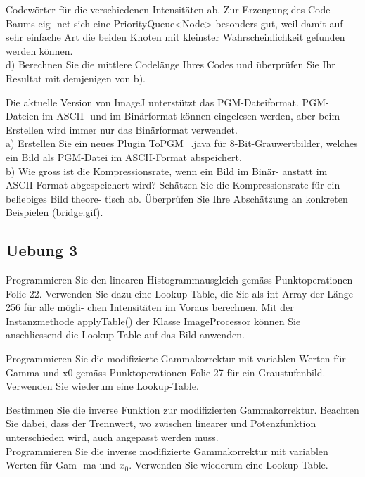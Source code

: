 \documentclass[10pt]{article}
\begin{document}
Codewörter für die verschiedenen Intensitäten ab. Zur Erzeugung des Code-Baums eig-
net sich eine PriorityQueue<Node> besonders gut, weil damit auf sehr einfache Art die
beiden Knoten mit kleinster Wahrscheinlichkeit gefunden werden können.\\
d) Berechnen Sie die mittlere Codelänge Ihres Codes und überprüfen Sie Ihr Resultat mit
demjenigen von b).


Die aktuelle Version von ImageJ unterstützt das PGM-Dateiformat. PGM-Dateien im ASCII-
und im Binärformat können eingelesen werden, aber beim Erstellen wird immer nur das
Binärformat verwendet.\\
a) Erstellen Sie ein neues Plugin ToPGM\_.java für 8-Bit-Grauwertbilder, welches ein Bild
als PGM-Datei im ASCII-Format abspeichert.\\
b) Wie gross ist die Kompressionsrate, wenn ein Bild im Binär- anstatt im ASCII-Format
abgespeichert wird? Schätzen Sie die Kompressionsrate für ein beliebiges Bild theore-
tisch ab. Überprüfen Sie Ihre Abschätzung an konkreten Beispielen (bridge.gif).

\subsection{Uebung 3}
Programmieren Sie den linearen Histogrammausgleich gemäss Punktoperationen Folie 22.
Verwenden Sie dazu eine Lookup-Table, die Sie als int-Array der Länge 256 für alle mögli-
chen Intensitäten im Voraus berechnen. Mit der Instanzmethode applyTable() der Klasse
ImageProcessor können Sie anschliessend die Lookup-Table auf das Bild anwenden.

Programmieren Sie die modifizierte Gammakorrektur mit variablen Werten für Gamma und
x0 gemäss Punktoperationen Folie 27 für ein Graustufenbild. Verwenden Sie wiederum eine
Lookup-Table.

Bestimmen Sie die inverse Funktion zur modifizierten Gammakorrektur. Beachten Sie dabei,
dass der Trennwert, wo zwischen linearer und Potenzfunktion unterschieden wird, auch
angepasst werden muss.\\
Programmieren Sie die inverse modifizierte Gammakorrektur mit variablen Werten für Gam-
ma und $x_0$. Verwenden Sie wiederum eine Lookup-Table.

\end{document}
